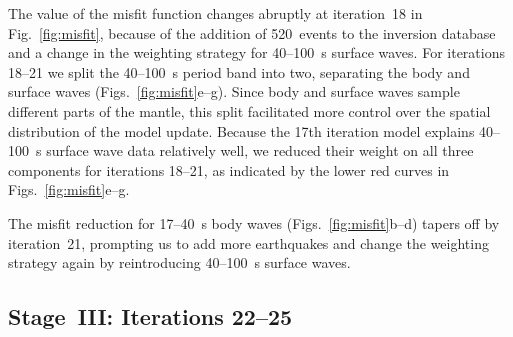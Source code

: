 \documentclass[extra,mreferee]{gji}
\begin{document}
The value of the misfit function changes abruptly at iteration~18
in Fig.~\ref{fig:misfit},
because of the addition of 520~events to the inversion database
and a change in the weighting strategy for 40--100~s surface waves.
For iterations 18--21 we split the 40--100~s period band into two, separating the
body and surface waves (Figs.~\ref{fig:misfit}e--g).
Since body and surface waves sample different parts of the mantle,
this split facilitated more control over the spatial distribution of the model update.
Because the 17th iteration model explains 40--100~s surface wave data relatively well,
we reduced their weight on all three components for iterations 18--21,
as indicated by the lower red curves in Figs.~\ref{fig:misfit}e--g.

The misfit reduction for 17--40~s body waves (Figs.~\ref{fig:misfit}b--d) tapers off by
iteration~21, prompting us to add more earthquakes and change the weighting strategy again by reintroducing 40--100~s surface waves.



\subsection{Stage~III: Iterations 22--25}
\label{sec:III}
\end{document}
